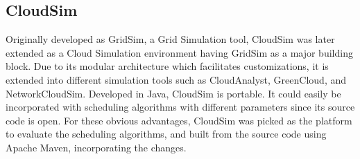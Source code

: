\documentclass{llncs}
\begin{document}
\subsection{CloudSim}
Originally developed as GridSim, a Grid Simulation tool, CloudSim was later extended as a Cloud Simulation environment having GridSim as a major building block\cite{cloudgridsim}. Due to its modular architecture which facilitates customizations, it is extended into different simulation tools such as CloudAnalyst\cite{cloudanalyst}, GreenCloud\cite{greencloud}, and NetworkCloudSim\cite{ncloudsim}. Developed in Java, CloudSim is portable. It could easily be incorporated with scheduling algorithms with different parameters since its source code is open. For these obvious advantages, CloudSim was picked as the platform to evaluate the scheduling algorithms, and built from the source code using Apache Maven, incorporating the changes.
\end{document}

